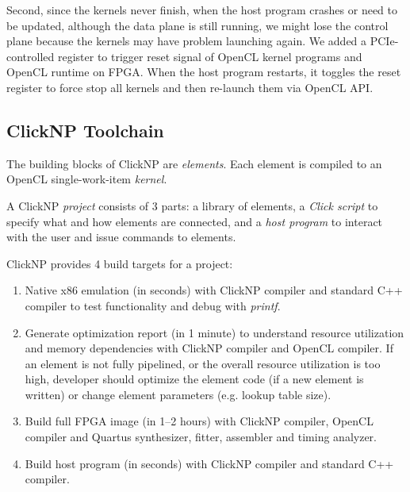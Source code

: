 {Second, since the kernels never finish, when the host program crashes or need to be updated, although the data plane is still running, we might lose the control plane because the kernels may have problem launching again. We added a PCIe-controlled register to trigger reset signal of OpenCL kernel programs and OpenCL runtime on FPGA. When the host program restarts, it toggles the reset register to force stop all kernels and then re-launch them via OpenCL API.

\subsection{ClickNP Toolchain}

The building blocks of ClickNP are \textit{elements}. Each element is compiled to an OpenCL single-work-item \textit{kernel}.

A ClickNP \textit{project} consists of 3 parts: a library of elements, a \textit{Click script} to specify what and how elements are connected, and a \textit{host program} to interact with the user and issue commands to elements.

ClickNP provides 4 build targets for a project:

\begin{enumerate}
	\item Native x86 emulation (in seconds) with ClickNP compiler and standard C++ compiler to test functionality and debug with \textit{printf}.
	\item Generate optimization report (in 1 minute) to understand resource utilization and memory dependencies with ClickNP compiler and OpenCL compiler. If an element is not fully pipelined, or the overall resource utilization is too high, developer should optimize the element code (if a new element is written) or change element parameters (e.g. lookup table size).
	\item Build full FPGA image (in 1--2 hours) with ClickNP compiler, OpenCL compiler and Quartus synthesizer, fitter, assembler and timing analyzer.
	\item Build host program (in seconds) with ClickNP compiler and standard C++ compiler.
\end{enumerate}


}

